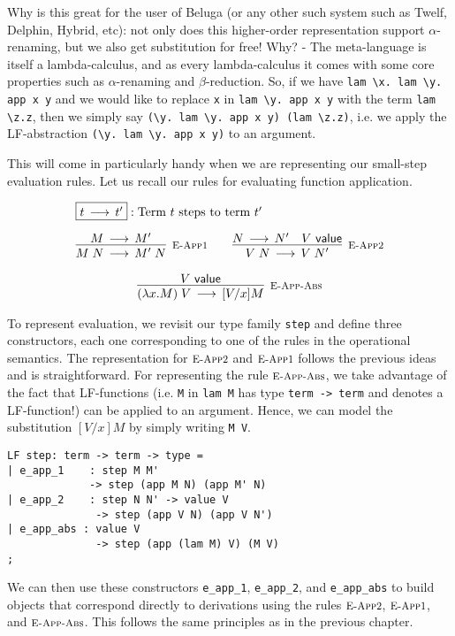 Why is this great for the user of Beluga (or any other such system such as Twelf, Delphin, Hybrid, etc): not only does this higher-order representation support $\alpha$-renaming, but we also get substitution for free! Why?  - The meta-language is itself a lambda-calculus, and as every lambda-calculus it comes with some core properties such as $\alpha$-renaming and $\beta$-reduction. So, if we
have \lstinline!lam \x. lam \y. app x y! and we would like to replace
\lstinline!x! in \lstinline!lam \y. app x y! with the term
\lstinline!lam \z.z!, then we simply say
\lstinline!(\y. lam \y. app x y) (lam \z.z)!, i.e. we apply the
LF-abstraction \lstinline!(\y. lam \y. app x y)! to an argument.

This will come in particularly handy when we are representing our small-step
evaluation rules. Let us recall our rules for evaluating function application.

\[
\begin{array}{c}
\multicolumn{1}{l}{\fbox{$t \Steps t'$}: \mbox{Term $t$ steps to term $t'$}}
\\[1em]
\infer[\EAppFnStep]{M \app N \Steps M'\;N}{M \Steps M'} \qquad
\infer[\EAppArgStep]{V \app N \Steps V\;N'}{N \Steps N' & V \Value}
\\[1em]
\infer[\EAppBeta]{(\lam x.M) \app V \Steps [V/x]M}{V \Value}
\end{array}
\]

To represent evaluation, we revisit our type family
\lstinline!step! and define three constructors, each one corresponding to one of
the rules in the operational semantics. The representation for $\textsc{\footnotesize E-App2}$
and $\textsc{\footnotesize E-App1}$ follows the previous ideas and is straightforward. For
representing the rule $\textsc{\footnotesize E-App-Abs}$, we take advantage of the fact that
LF-functions (i.e. \lstinline!M! in \lstinline!lam M! has type
\lstinline!term -> term! and denotes a LF-function!) can be applied to an
argument. Hence, we can model the substitution $[V/x]M$ by simply writing
\lstinline!M V!.

\begin{lstlisting}
LF step: term -> term -> type =
| e_app_1    : step M M'
             -> step (app M N) (app M' N)
| e_app_2    : step N N' -> value V
              -> step (app V N) (app V N')
| e_app_abs : value V
              -> step (app (lam M) V) (M V)
;
\end{lstlisting}

We can then use these constructors \lstinline!e_app_1!,
\lstinline!e_app_2!, and \lstinline!e_app_abs! to build objects that
correspond directly to derivations using the rules $\textsc{\footnotesize E-App2}$,
$\textsc{\footnotesize E-App1}$, and  $\textsc{\footnotesize E-App-Abs}$. This follows the same principles as in the
previous chapter.

